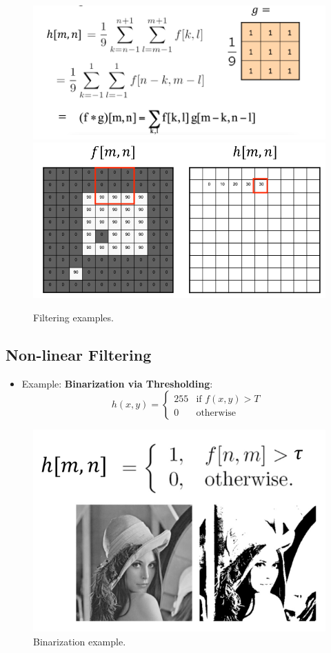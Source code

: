 \begin{figure}[htbp]
    \centering
    \includegraphics[scale=0.25]{figures/g.png}
    \includegraphics[scale=0.25]{figures/g2.png}
    \caption{Filtering examples.}
\end{figure}

\subsection{Non-linear Filtering}
\begin{itemize}
    \item Example: \textbf{Binarization via Thresholding}:
    $$
    h(x,y) = 
    \begin{cases} 
    255 & \text{if } f(x,y) > T \\
    0   & \text{otherwise}
    \end{cases}
    $$
\end{itemize}

\begin{figure}[htbp]
    \centering
    \includegraphics[scale=0.4]{figures/BinarizationviaThresholding.png}
    \caption{Binarization example.}
\end{figure}